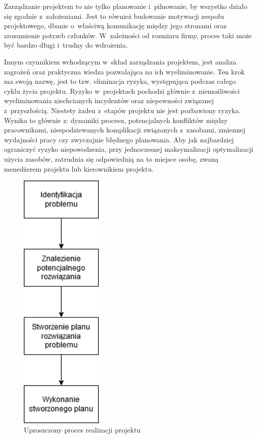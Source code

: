 \documentclass[oneside,polski,logo]{amuthesis}
\begin{document}
Zarządzanie projektem to nie tylko planowanie i~pilnowanie, by wszystko działo się zgodnie z~założeniami. Jest to również budowanie motywacji zespołu projektowego, dbanie o~właściwą komunikację między jego stronami oraz zrozumienie potrzeb członków. W~zależności od rozmiaru firmy, proces taki może być bardzo długi i~trudny do wdrożenia.

Innym czynnikiem wchodzącym w~skład zarządzania projektem, jest analiza zagrożeń oraz praktyczna wiedza pozwalająca na ich wyeliminowanie. Ten krok ma swoją nazwę, jest to tzw. eliminacja ryzyka, występująca podczas całego cyklu życia projektu. Ryzyko w~projektach pochodzi głównie z~niemożliwości wyeliminowania niechcianych incydentów oraz niepewności związanej z~przyszłością. Niestety żaden z~etapów projektu nie jest pozbawiony ryzyka. Wynika to głównie z: dynamiki procesu, potencjalnych konfliktów między pracownikami, niespodziewanych komplikacji związanych z~zasobami, zmiennej wydajności pracy czy zwyczajnie błędnego planowania. Aby jak najbardziej ograniczyć ryzyko niepowodzenia, przy jednoczesnej maksymalizacji optymalizacji użycia zasobów, zatrudnia się odpowiednią na to miejsce osobę, zwaną menedżerem projektu lub kierownikiem projektu.
\newpage

\begin{figure}[h]
	\centering
	\includegraphics[width=4cm]{images/hyps/diagram-zarzadzania-projektem.png}
	\caption{Uproszczony proces realizacji projektu}
\end{figure}
\end{document}
